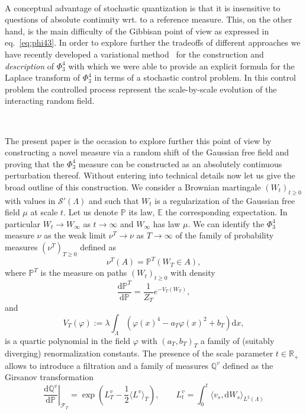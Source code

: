\documentclass[11pt]{article}
\newcommand{\assign}{:=}
\newcommand{\mathd}{\mathrm{d}}
\newcommand{\tmtextit}[1]{{\itshape{#1}}}
\newcommand{\CF}{\mathscr{F}}
\newcommand{\CS}{\mathscr{S}}
\begin{document}
\

A conceptual advantage of stochastic quantization is that it is insensitive
to questions of absolute continuity wrt. to a reference measure. This, on the
other hand, is the main difficulty of the Gibbisan point of view as expressed
in eq.~{\eqref{eq:phi43}}. In order to explore further the tradeoffs of
different approaches we have recently developed a variational
method~{\cite{barashkov_gubinelli_variational}} for the construction and
\tmtextit{description} of $\Phi^4_3$ with which we were able to provide an
explicit formula for the Laplace transform of $\Phi^4_3$ in terms of a
stochastic control problem. In this control problem the controlled process
represent the scale-by-scale evolution of the interacting random field.

\

The present paper is the occasion to explore further this point of view by
constructing a novel measure via a random shift of the Gaussian free field and
proving that the $\Phi^4_3$ measure can be constructed as an absolutely
continuous perturbation thereof. Without entering into technical details now
let us give the broad outline of this construction. We consider a Brownian
martingale $(W_t)_{t \geqslant 0}$ with values in $\CS' (\Lambda)$ and such
that $W_t$ is a regularization of the Gaussian free field $\mu$ at scale $t$.
Let us denote $\mathbb{P}$ its law, $\mathbb{E}$ the corresponding
expectation. In particular $W_t \rightarrow W_{\infty}$ as $t \rightarrow
\infty$ and $W_{\infty}$ has law $\mu$. We can identify the $\Phi^4_3$ measure
$\nu$ as the weak limit $\nu^T \rightarrow \nu$ as $T \rightarrow \infty$ of
the family of probability measures $(\nu^T)_{T \geqslant 0}$ defined as
\[ \nu^T (A) =\mathbb{P}^T (W_T \in A), \]
where $\mathbb{P}^T$ is the measure on paths $(W_t)_{t \geqslant 0}$ with
density
\[ \frac{\mathd \mathbb{P}^T}{\mathd \mathbb{P}} = \frac{1}{Z_T} e^{- V_T
   (W_T)}, \]
and
\[ V_T (\varphi) \assign \lambda \int_{\Lambda} (\varphi (x)^4 - a_T \varphi
   (x)^2 + b_T) \mathd x, \]
is a quartic polynomial in the field $\varphi$ with $(a_T, b_T)_T$ a family of
(suitably diverging) renormalization constants. The presence of the scale
parameter $t \in \mathbb{R}_+$ allows to introduce a filtration and a family
of measures $\mathbb{Q}^v$ defined as the Girsanov transformation
\begin{equation}
  \left. \frac{\mathd \mathbb{Q}^v}{\mathd \mathbb{P}} \right|_{\CF_T} = \exp
  \left( L_T^v - \frac{1}{2} \langle L^v \rangle_T \right), \qquad L^v_t =
  \int_0^t \langle v_s, \mathd W_s \rangle_{L^2 (\Lambda)} \label{eq:girs}
\end{equation}
\end{document}
